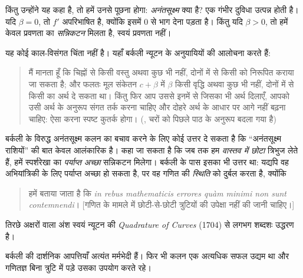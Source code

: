 \documentclass[../../../include/open-logic-section]{subfiles}
\begin{document}
किंतु उन्होंने यह कहा है, तो हमें उनसे पूछना होगा: \emph{अनंतसूक्ष्म} क्या
है? एक गंभीर दुविधा उत्पन्न होती है। यदि $\beta = 0$, तो $f'$ अपरिभाषित है,
क्योंकि इसमें $0$ से भाग देना पड़ता है। किंतु यदि $\beta > 0$, तो हमें केवल
प्रवणता का \emph{सन्निकटन} मिलता है, स्वयं प्रवणता नहीं।

यह कोई काल-विसंगत चिंता नहीं है। यहाँ बर्कली न्यूटन के अनुयायियों की आलोचना
करते हैं:
\begin{quote}
मैं मानता हूँ कि चिह्नों से किसी वस्तु अथवा कुछ भी नहीं, दोनों में से किसी
को निरूपित कराया जा सकता है; और फलतः मूल संकेतन $c + \beta$ में $\beta$
किसी वृद्धि अथवा कुछ भी नहीं, दोनों में से किसी का अर्थ दे सकता था। किंतु
फिर आप उससे इनमें से जिसका भी अर्थ दिलाएँ, आपको उसी अर्थ के अनुरूप संगत तर्क
करना चाहिए और दोहरे अर्थ के आधार पर आगे नहीं बढ़ना चाहिए: ऐसा करना स्पष्ट
कुतर्क होगा। (\citealt[\S{}XIII]{Berkeley1734}, चरों को पिछले पाठ के अनुरूप
बदला गया है)
\end{quote}
बर्कली के विरुद्ध अनंतसूक्ष्म कलन का बचाव करने के लिए कोई उत्तर दे सकता है
कि ``अनंतसूक्ष्म राशियों'' की बात केवल आलंकारिक है। कहा जा सकता है कि जब तक
हम \emph{वास्तव में छोटा} त्रिभुज लेते हैं, हमें स्पर्शरेखा का \emph{पर्याप्त
अच्छा} सन्निकटन मिलेगा। बर्कली के पास इसका भी उत्तर था: यद्यपि वह
अभियांत्रिकी के लिए पर्याप्त अच्छा हो सकता है, पर वह गणित की \emph{स्थिति}
को दुर्बल करता है, क्योंकि
\begin{quote}
हमें बताया जाता है कि \emph{in rebus mathematicis errores qu\`{a}m minimi
non sunt contemnendi}। [गणित के मामले में छोटी-से-छोटी त्रुटियों की उपेक्षा
नहीं की जानी चाहिए।] \citep[\S{}IX]{Berkeley1734}
\end{quote}
तिरछे अक्षरों वाला अंश स्वयं न्यूटन की \emph{Quadrature of Curves} (1704)
से लगभग शब्दशः उद्धरण है।

बर्कली की दार्शनिक आपत्तियाँ अत्यंत मर्मभेदी हैं। फिर भी कलन एक अत्यधिक सफल
उद्यम था और गणितज्ञ बिना त्रुटि में पड़े उसका उपयोग करते रहे।
\end{document}
